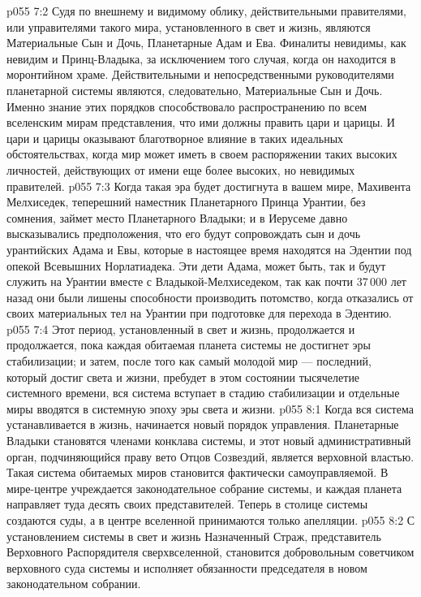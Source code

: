 \vs p055 7:2 Судя по внешнему и видимому облику, действительными правителями, или управителями такого мира, установленного в свет и жизнь, являются Материальные Сын и Дочь, Планетарные Адам и Ева. Финалиты невидимы, как невидим и Принц\hyp{}Владыка, за исключением того случая, когда он находится в моронтийном храме. Действительными и непосредственными руководителями планетарной системы являются, следовательно, Материальные Сын и Дочь. Именно знание этих порядков способствовало распространению по всем вселенским мирам представления, что ими должны править цари и царицы. И цари и царицы оказывают благотворное влияние в таких идеальных обстоятельствах, когда мир может иметь в своем распоряжении таких высоких личностей, действующих от имени еще более высоких, но невидимых правителей.
\vs p055 7:3 Когда такая эра будет достигнута в вашем мире, Махивента Мелхиседек, теперешний наместник Планетарного Принца Урантии, без сомнения, займет место Планетарного Владыки; и в Иерусеме давно высказывались предположения, что его будут сопровождать сын и дочь урантийских Адама и Евы, которые в настоящее время находятся на Эдентии под опекой Всевышних Норлатиадека. Эти дети Адама, может быть, так и будут служить на Урантии вместе с Владыкой\hyp{}Мелхиседеком, так как почти 37\,000 лет назад они были лишены способности производить потомство, когда отказались от своих материальных тел на Урантии при подготовке для перехода в Эдентию.
\vs p055 7:4 \pc Этот период, установленный в свет и жизнь, продолжается и продолжается, пока каждая обитаемая планета системы не достигнет эры стабилизации; и затем, после того как самый молодой мир --- последний, который достиг света и жизни, пребудет в этом состоянии тысячелетие системного времени, вся система вступает в стадию стабилизации и отдельные миры вводятся в системную эпоху эры света и жизни.
\vs p055 8:1 Когда вся система устанавливается в жизнь, начинается новый порядок управления. Планетарные Владыки становятся членами конклава системы, и этот новый административный орган, подчиняющийся праву вето Отцов Созвездий, является верховной властью. Такая система обитаемых миров становится фактически самоуправляемой. В мире\hyp{}центре учреждается законодательное собрание системы, и каждая планета направляет туда десять своих представителей. Теперь в столице системы создаются суды, а в центре вселенной принимаются только апелляции.
\vs p055 8:2 С установлением системы в свет и жизнь Назначенный Страж, представитель Верховного Распорядителя сверхвселенной, становится добровольным советчиком верховного суда системы и исполняет обязанности председателя в новом законодательном собрании.
